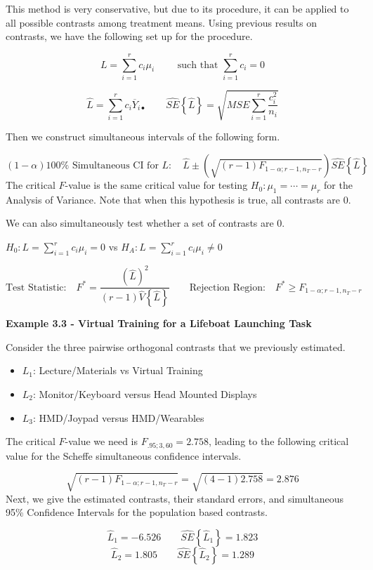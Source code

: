 \documentclass[
]{book}
\providecommand{\tightlist}{%
  \setlength{\itemsep}{0pt}\setlength{\parskip}{0pt}}
\begin{document}
This method is very conservative, but due to its procedure, it can be
applied to all possible contrasts among treatment means. Using previous
results on contrasts, we have the following set up for the procedure.

\[
L=\sum_{i=1}^rc_i \mu_i \qquad \mbox{ such that } \sum_{i=1}^rc_i=0
\]

\[
\hat{L}=\sum_{i=1}^rc_i\overline{Y}_{i\bullet}  \qquad
\hat{SE}\left\{\hat{L}\right\}=\sqrt{MSE\sum_{i=1}^r\frac{c_i^2}{n_i}}
\]

Then we construct simultaneous intervals of the following form.

\[
(1-\alpha)100\% \mbox{ Simultaneous CI for }L: \quad
\hat{L} \pm \left(\sqrt{(r-1)F_{1-\alpha;r-1,n_T-r}}\right)
\hat{SE}\left\{\hat{L}\right\}
\] The critical \(F\)-value is the same critical value for testing
\(H_0:\mu_1=\cdots = \mu_r\) for the Analysis of Variance. Note that
when this hypothesis is true, all contrasts are 0.

We can also simultaneously test whether a set of contrasts are 0.

\(H_0:L=\sum_{i=1}^r c_i\mu_i=0\) vs
\(H_A:L=\sum_{i=1}^r c_i\mu_i \ne 0\)

\[
\mbox{Test Statistic:} \quad 
F^*=\frac{\left(\hat{L}\right)^2}{(r-1)\hat{V}\left\{\hat{L}\right\}}
\qquad
\mbox{Rejection Region:} \quad F^*\geq F_{1-\alpha;r-1,n_T-r}
\]

\textbf{Example 3.3 - Virtual Training for a Lifeboat Launching Task}

Consider the three pairwise orthogonal contrasts that we previously
estimated.

\begin{itemize}
\tightlist
\item
  \(L_1\): Lecture/Materials vs Virtual Training
\item
  \(L_2\): Monitor/Keyboard versus Head Mounted Displays
\item
  \(L_3\): HMD/Joypad versus HMD/Wearables
\end{itemize}

The critical \(F\)-value we need is \(F_{.95;3,60}=2.758\), leading to
the following critical value for the Scheffe simultaneous confidence
intervals.

\[
\sqrt{(r-1)F_{1-\alpha;r-1,n_T-r}}=
\sqrt{(4-1)2.758}=2.876
\] Next, we give the estimated contrasts, their standard errors, and
simultaneous 95\% Confidence Intervals for the population based
contrasts.

\[
\hat{L}_1=-6.526 \qquad \hat{SE}\left\{\hat{L}_1\right\}=1.823 
\] \[
\hat{L}_2=1.805 \qquad \hat{SE}\left\{\hat{L}_2\right\}=1.289 
\]
\end{document}
